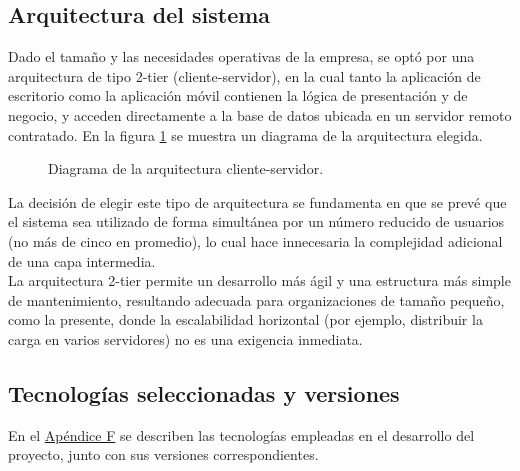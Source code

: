 \documentclass[a4paper, 12pt,twoside]{report}  %
\numberwithin{equation}{subsection} %
\begin{document}
\subsection{Arquitectura del sistema}
\indent Dado el tamaño y las necesidades operativas de la empresa, se optó por una arquitectura de tipo 2-tier (cliente-servidor), en la cual tanto la aplicación de escritorio como la aplicación móvil contienen la lógica de presentación y de negocio, y acceden directamente a la base de datos ubicada en un servidor remoto contratado. En la figura \ref{diagrama_cliente_servidor} se muestra un diagrama de la arquitectura elegida.

\begin{figure}[H]
	\centering
	{%
		\setlength{\fboxsep}{0pt}%
		\setlength{\fboxrule}{0.5pt}%
	}%
	\caption{Diagrama de la arquitectura cliente-servidor.}
	\label{diagrama_cliente_servidor}
\end{figure}

La decisión de elegir este tipo de arquitectura se fundamenta en que se prevé que el sistema sea utilizado de forma simultánea por un número reducido de usuarios (no más de cinco en promedio), lo cual hace innecesaria la complejidad adicional de una capa intermedia.\\
\indent La arquitectura 2-tier permite un desarrollo más ágil y una estructura más simple de mantenimiento, resultando adecuada para organizaciones de tamaño pequeño, como la presente, donde la escalabilidad horizontal (por ejemplo, distribuir la carga en varios servidores) no es una exigencia inmediata.

\subsection{Tecnologías seleccionadas y versiones}
En el \hyperlink{apendice_f}{Apéndice F} se describen las tecnologías empleadas en el desarrollo del proyecto, junto con sus versiones correspondientes.
\end{document}
